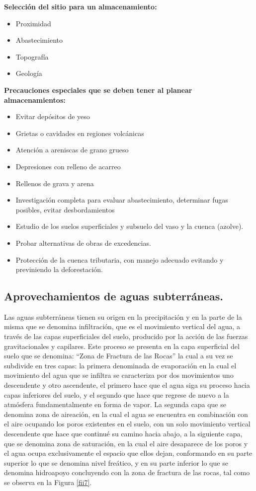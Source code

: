 \textbf{Selección del sitio para un almacenamiento:}
\begin{itemize}
	\item Proximidad
	\item Abastecimiento
	\item Topografía
	\item Geología
\end{itemize}

\textbf{Precauciones especiales que se deben tener al planear almacenamientos:}
\begin{itemize}
	\item Evitar depósitos de yeso
	\item Grietas o cavidades en regiones volcánicas
	\item Atención a areniscas de grano grueso
	\item Depresiones con relleno de acarreo
	\item Rellenos de grava y arena
	\item Investigación completa para evaluar abastecimiento, determinar fugas posibles, evitar desbordamientos
	\item Estudio de los suelos superficiales y subsuelo del vaso y la cuenca (azolve).
	\item Probar alternativas de obras de excedencias.
	\item Protección de la cuenca tributaria, con manejo adecuado evitando y previniendo
	      la deforestación.
\end{itemize}

\subsection{Aprovechamientos de aguas subterráneas.}

Las aguas subterráneas tienen su origen en la precipitación y en la parte de la
misma que se denomina infiltración, que es el movimiento vertical del agua, a través de
las capas superficiales del suelo, producido por la acción de las fuerzas gravitacionales
y capilares. Este proceso se presenta en la capa superficial del suelo que se denomina:
``Zona de Fractura de las Rocas'' la cual a su vez se subdivide en tres capas: la primera
denominada de evaporación en la cual el movimiento del agua que se infiltra se
caracteriza por dos movimientos uno descendente y otro ascendente, el primero hace
que el agua siga su proceso hacia capas inferiores del suelo, y el segundo que hace
que regrese de nuevo a la atmósfera fundamentalmente en forma de vapor. La segunda
capa que se denomina zona de aireación, en la cual el agua se encuentra en
combinación con el aire ocupando los poros existentes en el suelo, con un solo
movimiento vertical descendente que hace que continué su camino hacia abajo, a la
siguiente capa, que se denomina zona de saturación, en la cual el aire desaparece de
los poros y el agua ocupa exclusivamente el espacio que ellos dejan, conformando en
su parte superior lo que se denomina nivel freático, y en su parte inferior lo que se
denomina hidroapoyo concluyendo con la zona de fractura de las rocas, tal como se
observa en la Figura \ref{fii7}.


